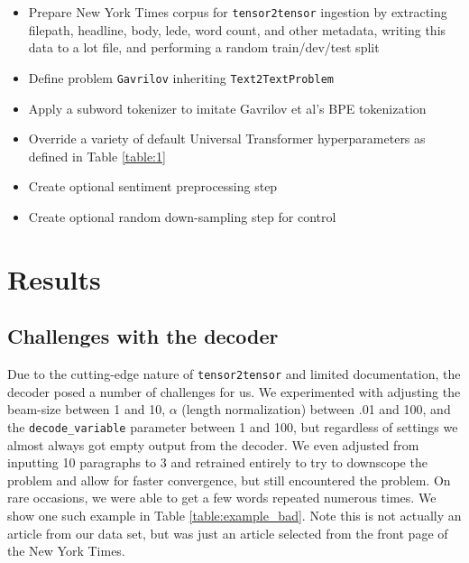 \documentclass[11pt]{article}
\begin{document}
\begin{itemize}
    \item Prepare New York Times corpus for \texttt{tensor2tensor} ingestion by extracting filepath, headline, body, lede, word count, and other metadata, writing this data to a lot file, and performing a random train/dev/test split
    \item Define problem \texttt{Gavrilov} inheriting \texttt{Text2TextProblem}
    \item Apply a subword tokenizer to imitate Gavrilov et al's BPE tokenization
    \item Override a variety of default Universal Transformer hyperparameters as defined in Table \ref{table:1}
    \item Create optional sentiment preprocessing step
    \item Create optional random down-sampling step for control
\end{itemize}

\section{Results}
\subsection{Challenges with the decoder}

Due to the cutting-edge nature of \texttt{tensor2tensor} and limited documentation, the decoder posed a number of challenges for us. We experimented with adjusting the beam-size between 1 and 10, $\alpha$ (length normalization) between .01 and 100, and the \texttt{decode\_variable} parameter between 1 and 100, but regardless of settings we almost always got empty output from the decoder. We even adjusted from inputting 10 paragraphs to 3 and retrained entirely to try to downscope the problem and allow for faster convergence, but still encountered the problem. On rare occasions, we were able to get a few words repeated numerous times. We show one such example in Table \ref{table:example_bad}. Note this is not actually an article from our data set, but was just an article selected from the front page of the New York Times.
\end{document}
